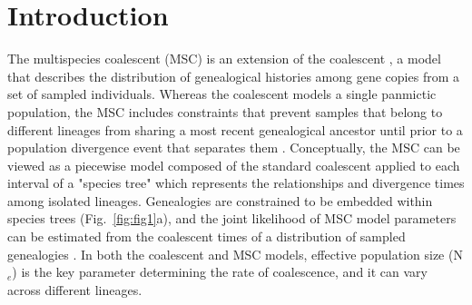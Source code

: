\documentclass[11pt]{article}
\begin{document}
\section{Introduction}


The multispecies coalescent (MSC) is an extension of the coalescent 
\citep{kingman1982coalescent}, a model that describes the distribution of genealogical 
histories among gene copies from a set of sampled individuals. Whereas the 
coalescent models a single panmictic population, the MSC includes constraints that prevent 
samples that belong to different lineages from sharing a most recent genealogical ancestor until prior
to a population divergence event that separates them \citep{maddison1997gene,maddison2006inferring}. 
Conceptually, the MSC can be viewed as a piecewise model composed of the standard
coalescent applied to each interval of a "species tree" which represents the relationships
and divergence times among isolated lineages. Genealogies are constrained to be
embedded within species trees (Fig.~\ref{fig:fig1}a), and the joint likelihood of 
MSC model parameters can be estimated from the coalescent times of a 
distribution of sampled genealogies
\citep{rannala2003bayes,degnan2009gene}. In both the coalescent
and MSC models, effective population size (N$_e$) is the key parameter determining 
the rate of coalescence, and it can vary across different lineages. 
\end{document}
